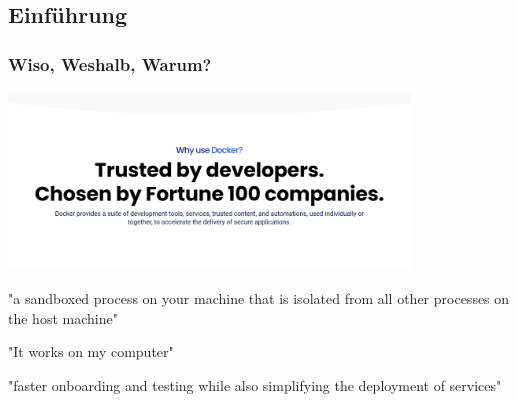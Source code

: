 \documentclass[22pt]{beamer}
\begin{document}
\subsection{Einführung}
\begin{frame}
    \frametitle{Wiso, Weshalb, Warum?}
    \begin{center}
        \includegraphics[width=0.8\textwidth]{Bilder/docker-why.png}
    \end{center}\pause
    \begin{center}
        "a sandboxed process on your machine that is isolated from all other processes on the host machine"
    \end{center}\pause
    \begin{center}
        "It works on my computer"
    \end{center}\pause
    \begin{center}
        "faster onboarding and testing while also simplifying the deployment of services"
    \end{center}
\end{frame}
\end{document}
